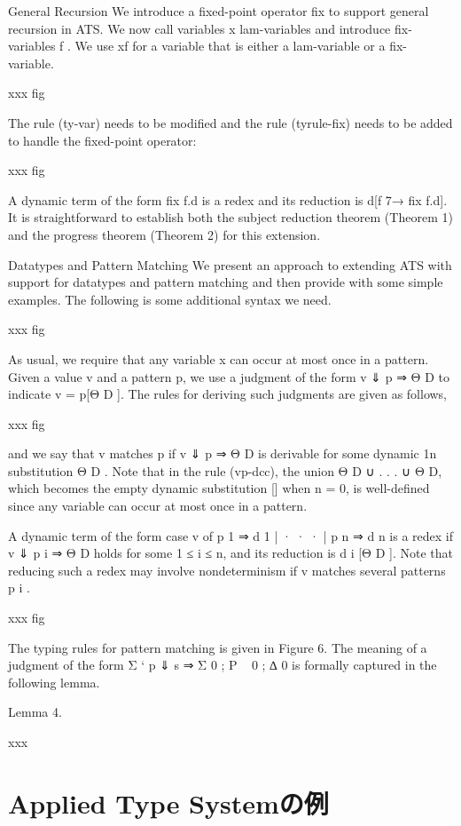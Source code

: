 \documentclass[submit,techreq,noauthor,onecolumn]{ipsj}
\begin{document}
General Recursion We introduce a fixed-point operator fix to support general
recursion in ATS. We now call variables x lam-variables and introduce fix-
variables f . We use xf for a variable that is either a lam-variable or a fix-
variable.

xxx fig

The rule (ty-var) needs to be modified and the rule (tyrule-fix) needs to be added to handle the fixed-point operator:

xxx fig

A dynamic term of the form fix f.d is a redex and its reduction is d[f 7→ fix f.d].
It is straightforward to establish both the subject reduction theorem (Theorem 1)
and the progress theorem (Theorem 2) for this extension.

Datatypes and Pattern Matching We present an approach to extending
ATS with support for datatypes and pattern matching and then provide with
some simple examples. The following is some additional syntax we need.

xxx fig

As usual, we require that any variable x can occur at most once in a pattern.
Given a value v and a pattern p, we use a judgment of the form v ⇓ p ⇒ Θ D to
indicate v = p[Θ D ]. The rules for deriving such judgments are given as follows,

xxx fig

and we say that v matches p if v ⇓ p ⇒ Θ D is derivable for some dynamic 1n
substitution Θ D . Note that in the rule (vp-dcc), the union Θ D ∪ . . . ∪ Θ D,
which becomes the empty dynamic substitution [] when n = 0, is well-defined
since any variable can occur at most once in a pattern.

A dynamic term of the form case v of p 1 ⇒ d 1 | · · · | p n ⇒ d n is a redex if
v ⇓ p i ⇒ Θ D holds for some 1 ≤ i ≤ n, and its reduction is d i [Θ D ]. Note that reducing such a redex may involve nondeterminism if v matches several patterns p i .

xxx fig

The typing rules for pattern matching is given in Figure 6. The meaning of
a judgment of the form Σ ` p ⇓ s ⇒ Σ 0 ; P ~ 0 ; ∆ 0 is formally captured in the
following lemma.

Lemma 4.

xxx

\section{Applied Type Systemの例}
\end{document}
